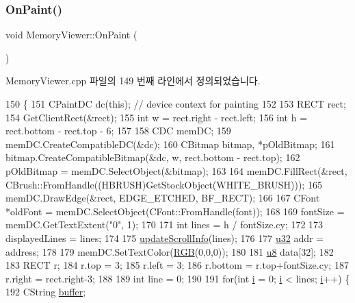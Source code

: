 \subsubsection{\texorpdfstring{On\+Paint()}{OnPaint()}}
{\footnotesize\ttfamily void Memory\+Viewer\+::\+On\+Paint (\begin{DoxyParamCaption}{ }\end{DoxyParamCaption})\hspace{0.3cm}{\ttfamily [protected]}}



Memory\+Viewer.\+cpp 파일의 149 번째 라인에서 정의되었습니다.


\begin{DoxyCode}
150 \{
151   CPaintDC dc(\textcolor{keyword}{this}); \textcolor{comment}{// device context for painting}
152   
153   RECT rect;
154   GetClientRect(&rect);
155   \textcolor{keywordtype}{int} w = rect.right - rect.left;
156   \textcolor{keywordtype}{int} h = rect.bottom - rect.top - 6;
157   
158   CDC memDC;
159   memDC.CreateCompatibleDC(&dc);
160   CBitmap bitmap, *pOldBitmap;
161   bitmap.CreateCompatibleBitmap(&dc, w, rect.bottom - rect.top);
162   pOldBitmap = memDC.SelectObject(&bitmap);
163   
164   memDC.FillRect(&rect, CBrush::FromHandle((HBRUSH)GetStockObject(WHITE\_BRUSH)));
165   memDC.DrawEdge(&rect, EDGE\_ETCHED, BF\_RECT);
166   
167   CFont *oldFont = memDC.SelectObject(CFont::FromHandle(font));
168   
169   fontSize = memDC.GetTextExtent(\textcolor{stringliteral}{"0"}, 1);
170   
171   \textcolor{keywordtype}{int} lines = h / fontSize.cy;
172   
173   displayedLines = lines;
174   
175   \mbox{\hyperlink{class_memory_viewer_aa133e5db4bf989efa18892de371c0f43}{updateScrollInfo}}(lines);
176   
177   \mbox{\hyperlink{_system_8h_a10e94b422ef0c20dcdec20d31a1f5049}{u32}} addr = address;
178   
179   memDC.SetTextColor(\mbox{\hyperlink{bilinear_8cpp_a4a118ad3ee36468a3fa616977a64864e}{RGB}}(0,0,0));
180   
181   \mbox{\hyperlink{_system_8h_aed742c436da53c1080638ce6ef7d13de}{u8}} data[32];
182   
183   RECT r;
184   r.top = 3;
185   r.left = 3;
186   r.bottom = r.top+fontSize.cy;
187   r.right = rect.right-3;
188   
189   \textcolor{keywordtype}{int} line = 0;
190   
191   \textcolor{keywordflow}{for}(\textcolor{keywordtype}{int} \mbox{\hyperlink{expr-lex_8cpp_acb559820d9ca11295b4500f179ef6392}{i}} = 0; \mbox{\hyperlink{expr-lex_8cpp_acb559820d9ca11295b4500f179ef6392}{i}} < lines; \mbox{\hyperlink{expr-lex_8cpp_acb559820d9ca11295b4500f179ef6392}{i}}++) \{
192     CString \mbox{\hyperlink{_g_b_a_8cpp_a28d4d3d8445e73a696b2d6f7eadabd96}{buffer}};

\end{DoxyCode}
